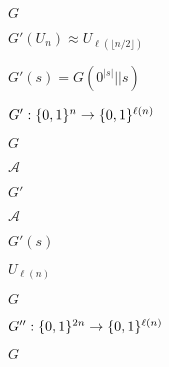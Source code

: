\documentclass[10pt]{book}
\begin{document}
\begin{mdSnippets}
\begin{mdInlineSnippet}[dfcf28d0734569a6a693bc8194de62bf]%
$G$\end{mdInlineSnippet}%
\begin{mdInlineSnippet}[aa21c3060ad459144264e541d52f5941]%
$G'(U_{n}) \approx U_{\ell(\lfloor n/2 \rfloor)}$\end{mdInlineSnippet}%
\begin{mdInlineSnippet}[58365c3d9d0d0f3250d04678b11b2424]%
$G'(s) = G(0^{|s|}|| s)$\end{mdInlineSnippet}%
\begin{mdInlineSnippet}[bd4b5a403ff5b2a71558ec03bc3efc5e]%
$G': \{0,1\}^{n} \to \{0,1\}^{\ell(n)}$\end{mdInlineSnippet}%
\begin{mdInlineSnippet}[dfcf28d0734569a6a693bc8194de62bf]%
$G$\end{mdInlineSnippet}%
\begin{mdInlineSnippet}[ad70146b431bea9ae74cf8385470c544]%
$\mathcal{A}$\end{mdInlineSnippet}%
\begin{mdInlineSnippet}[b1c5660b1392ecb094b31a0e42253ff9]%
$G'$\end{mdInlineSnippet}%
\begin{mdInlineSnippet}[ad70146b431bea9ae74cf8385470c544]%
$\mathcal{A}$\end{mdInlineSnippet}%
\begin{mdInlineSnippet}%
$G'(s)$\end{mdInlineSnippet}%
\begin{mdInlineSnippet}[c77c7d0bbe417432357a68cc2d877048]%
$U_{\ell(n)}$\end{mdInlineSnippet}%
\begin{mdInlineSnippet}[dfcf28d0734569a6a693bc8194de62bf]%
$G$\end{mdInlineSnippet}%
\begin{mdInlineSnippet}[761b450655a9ef9d5165fd397833a568]%
$G'': \{0,1\}^{2n} \to \{0,1\}^{\ell(n)}$\end{mdInlineSnippet}%
\begin{mdInlineSnippet}[dfcf28d0734569a6a693bc8194de62bf]%
$G$\end{mdInlineSnippet}%

\end{mdSnippets}
\end{document}
